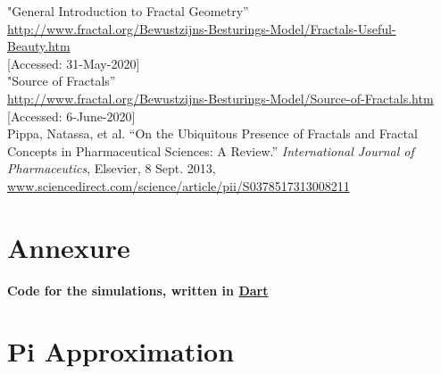 \documentclass{resonance}
\begin{document}
\begin{thebibliography}{99}
		"General Introduction to Fractal Geometry”\\ \textcolor{blue}{\url{http://www.fractal.org/Bewustzijns-Besturings-Model/Fractals-Useful-Beauty.htm}}\\
		{[Accessed: 31-May-2020]}\\
		
		"Source of Fractals”\\ \textcolor{blue}{\url{http://www.fractal.org/Bewustzijns-Besturings-Model/Source-of-Fractals.htm}}\\
		{[Accessed: 6-June-2020]}\\
		
		Pippa, Natassa, et al. “On the Ubiquitous Presence of Fractals and Fractal Concepts in Pharmaceutical Sciences: A Review.” \textit{International Journal of Pharmaceutics}, Elsevier, 8 Sept. 2013,\\
		\textcolor{blue}{\url{www.sciencedirect.com/science/article/pii/S0378517313008211}}
		
	\end{thebibliography}
	
	\pagebreak
	
	\setlength{\leftskip}{0cm}
	\section*{Annexure}
	
	\textbf{Code for the simulations, written in \textcolor{blue}{\href{https://github.com/dart-lang/sdk}{Dart}}}
	
	\setcounter{section}{0}
	\section{Pi Approximation}
	
\end{document}
